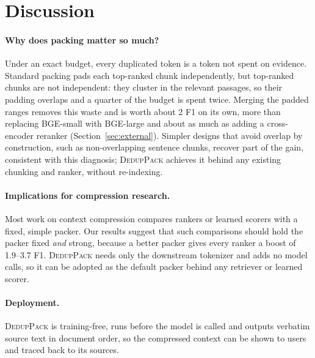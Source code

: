 \documentclass[11pt]{article}
\newcommand{\spk}{\textsc{DedupPack}}
\begin{document}
\section{Discussion}

\paragraph{Why does packing matter so much?} Under an exact budget, every duplicated token is a token not spent on evidence. Standard packing pads each top-ranked chunk independently, but top-ranked chunks are not independent: they cluster in the relevant passages, so their padding overlaps and a quarter of the budget is spent twice. Merging the padded ranges removes this waste and is worth about 2 F1 on its own, more than replacing BGE-small with BGE-large and about as much as adding a cross-encoder reranker (Section~\ref{sec:external}). Simpler designs that avoid overlap by construction, such as non-overlapping sentence chunks, recover part of the gain, consistent with this diagnosis; \spk{} achieves it behind any existing chunking and ranker, without re-indexing.

\paragraph{Implications for compression research.} Most work on context compression compares rankers or learned scorers with a fixed, simple packer. Our results suggest that such comparisons should hold the packer fixed \emph{and} strong, because a better packer gives every ranker a boost of 1.9--3.7 F1. \spk{} needs only the downstream tokenizer and adds no model calls, so it can be adopted as the default packer behind any retriever or learned scorer.

\paragraph{Deployment.} \spk{} is training-free, runs before the model is called and outputs verbatim source text in document order, so the compressed context can be shown to users and traced back to its sources.

\end{document}
